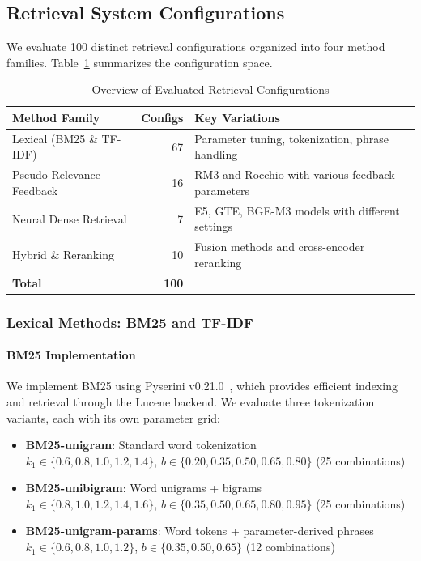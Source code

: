 \documentclass[preprint,12pt]{elsarticle}
\begin{document}
\subsection{Retrieval System Configurations}

We evaluate 100 distinct retrieval configurations organized into four method families. Table~\ref{tab:method_families} summarizes the configuration space.

\begin{table}[ht]
\centering
\caption{Overview of Evaluated Retrieval Configurations}
\label{tab:method_families}
\begin{tabular}{|l|r|p{6cm}|}
\hline
\textbf{Method Family} & \textbf{Configs} & \textbf{Key Variations} \\
\hline
Lexical (BM25 \& TF-IDF) & 67 & Parameter tuning, tokenization, phrase handling \\
Pseudo-Relevance Feedback & 16 & RM3 and Rocchio with various feedback parameters \\
Neural Dense Retrieval & 7 & E5, GTE, BGE-M3 models with different settings \\
Hybrid \& Reranking & 10 & Fusion methods and cross-encoder reranking \\
\hline
\textbf{Total} & \textbf{100} & \\
\hline
\end{tabular}
\end{table}

\subsubsection{Lexical Methods: BM25 and TF-IDF}
\label{subsec:lexical_methods}

\paragraph{BM25 Implementation}

We implement BM25 using Pyserini v0.21.0~\citep{lin2021pyserini}, which provides efficient indexing and retrieval through the Lucene backend. We evaluate three tokenization variants, each with its own parameter grid:
\begin{itemize}
    \item \textbf{BM25-unigram}: Standard word tokenization\\
    $k_1 \in \{0.6, 0.8, 1.0, 1.2, 1.4\}$, $b \in \{0.20, 0.35, 0.50, 0.65, 0.80\}$ (25 combinations)
    \item \textbf{BM25-unibigram}: Word unigrams + bigrams\\
    $k_1 \in \{0.8, 1.0, 1.2, 1.4, 1.6\}$, $b \in \{0.35, 0.50, 0.65, 0.80, 0.95\}$ (25 combinations)
    \item \textbf{BM25-unigram-params}: Word tokens + parameter-derived phrases\\
    $k_1 \in \{0.6, 0.8, 1.0, 1.2\}$, $b \in \{0.35, 0.50, 0.65\}$ (12 combinations)
\end{itemize}
\end{document}
